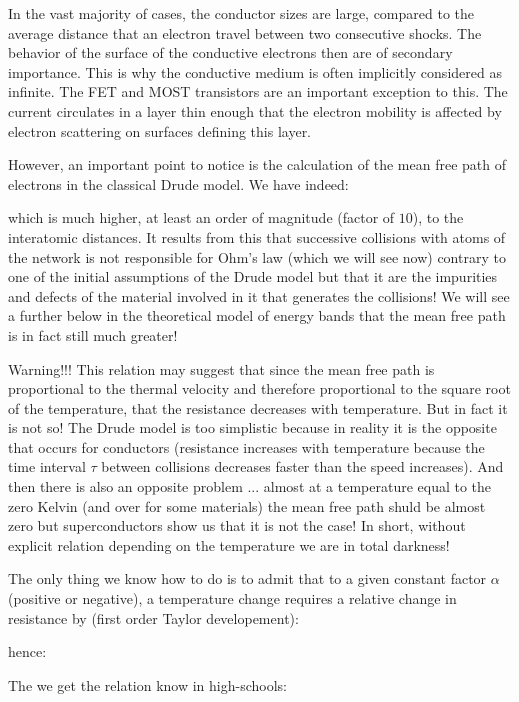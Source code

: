 	\begin{tcolorbox}[title=Remark,colframe=black,arc=10pt]
	In the vast majority of cases, the conductor sizes are large, compared to the average distance that an electron travel between two consecutive shocks. The behavior of the surface of the conductive electrons then are of secondary importance. This is why the conductive medium is often implicitly considered as infinite. The FET and MOST transistors  are an important exception to this. The current circulates in a layer thin enough that the electron mobility is affected by electron scattering on surfaces defining this layer.
	\end{tcolorbox}
	However, an important point to notice is the calculation of the mean free path of electrons in the classical Drude model. We have indeed:
	
	which is much higher, at least an order of magnitude (factor of $10$), to the interatomic distances. It results from this that successive collisions with atoms of the network is not responsible for Ohm's law (which we will see now) contrary to one of the initial assumptions of the Drude model but that it are the impurities and defects of the material involved in it that generates the collisions! We will see a further below in the theoretical model of energy bands that the mean free path is in fact still much greater!
	
	Warning!!! This relation may suggest that since the mean free path is proportional to the thermal velocity and therefore proportional to the square root of the temperature, that the resistance decreases with temperature. But in fact it is not so! The Drude model is too simplistic because in reality it is the opposite that occurs for conductors (resistance increases with temperature because the time interval $\tau$ between collisions decreases faster than the speed increases). And then there is also an opposite problem ... almost at a temperature equal to the zero Kelvin (and over for some materials) the mean free path shuld be almost zero but superconductors show us that it is not the case! In short, without explicit relation depending on the temperature we are in total darkness!
	
	The only thing we know how to do is to admit that to a given constant factor $\alpha$ (positive or negative), a temperature change requires a relative change in resistance by (first order Taylor developement):
	
	hence:
	
	The we get the relation know in high-schools:
	
